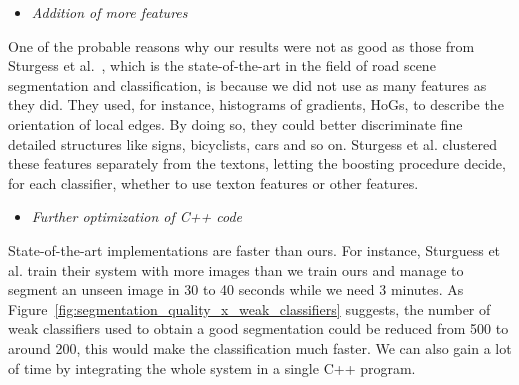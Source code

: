 \begin{itemize}
 \item \emph{Addition of more features}
\end{itemize}

One of the probable reasons why our results were not as good as those from Sturgess et al.~\cite{sturgess:road_scene}, which is the state-of-the-art in the field of road scene segmentation and classification, is because we did not use as many features as they did. They used, for instance, histograms of gradients, HoGs, to describe the orientation of local edges. By doing so, they could better discriminate fine detailed structures like signs, bicyclists, cars and so on. Sturgess et al. clustered these features separately from the textons, letting the boosting procedure decide, for each classifier, whether to use texton features or other features.


\begin{itemize}
 \item \emph{Further optimization of C++ code}
\end{itemize}

State-of-the-art implementations are faster than ours. For instance, Sturguess et al. train their system with more images than we train ours and manage to segment an unseen image in 30 to 40 seconds while we need 3 minutes. As Figure~\ref{fig:segmentation_quality_x_weak_classifiers} suggests, the number of weak classifiers used to obtain a good segmentation could be reduced from 500 to around 200, this would make the classification much faster. We can also gain a lot of time by integrating the whole system in a single C++ program.

% 
% 











